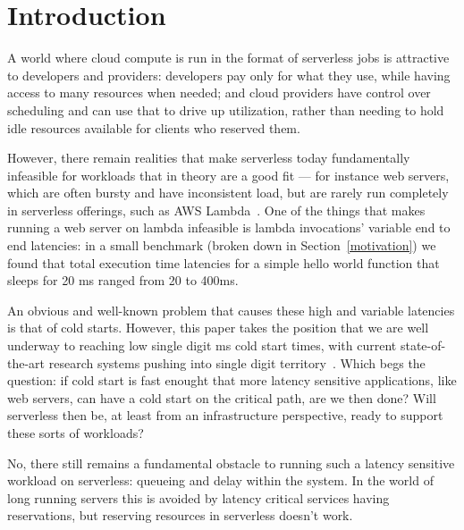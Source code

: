\section{Introduction}

A world where cloud compute is run in the format of serverless jobs is
attractive to developers and providers: developers pay only for what they use,
while having access to many resources when needed; and cloud providers have
control over scheduling and can use that to drive up utilization, rather than
needing to hold idle resources available for clients who reserved them.


However, there remain realities that make serverless today fundamentally
infeasible for workloads that in theory are a good fit --- for instance web
servers, which are often bursty and have inconsistent load, but are rarely run
completely in serverless offerings, such as AWS Lambda~\cite{TODO}. One of the
things that makes running a web server on lambda infeasible is lambda
invocations' variable end to end latencies: in a small benchmark (broken down in
Section~\ref{motivation}) we found that total execution time latencies for a
simple hello world function that sleeps for 20 ms ranged from 20 to 400ms.

An obvious and well-known problem that causes these high and variable latencies
is that of cold starts. However, this paper takes the position that we are well
underway to reaching low single digit ms cold start times, with current
state-of-the-art research systems pushing into single digit
territory~\cite{TODO}. Which begs the question: if cold start is fast enought
that more latency sensitive applications, like web servers, can have a cold
start on the critical path, are we then done? Will serverless then be, at least
from an infrastructure perspective, ready to support these sorts of workloads?

No, there still remains a fundamental obstacle to running such a latency
sensitive workload on serverless: queueing and delay within the system. In the
world of long running servers this is avoided by latency critical services
having reservations, but reserving resources in serverless doesn't work. 


